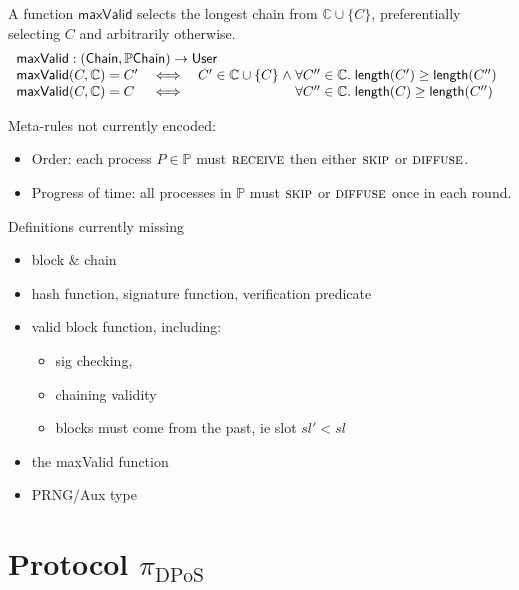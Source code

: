 \documentclass[12pt]{article}
\newcommand{\fun}[1]{\mathsf{#1}}
\begin{document}
A function $\fun{maxValid}$ selects the longest chain from
$\mathbb{C} \cup \{C\}$, preferentially selecting $C$ and arbitrarily otherwise.
\begin{equation*}
\begin{array}{l}
\fun{maxValid} : (\mathsf{Chain}, \mathbb{P}\mathsf{Chain}) \rightarrow \mathsf{User}
\\
\begin{array}{@{}l@{\quad \iff \quad}l@{}l}
\fun{maxValid} (C, \mathbb{C}) = C'
&
C' \in \mathbb{C} \cup \{C\}\; \land \; & \forall C'' \in \mathbb{C}.\; \mathsf{length}(C') \geq \mathsf{length}(C'')
\\
\fun{maxValid} (C, \mathbb{C}) = C 
&
& \forall C'' \in \mathbb{C}.\; \mathsf{length}(C) \geq \mathsf{length}(C'')
\end{array}
\end{array}
\end{equation*}


Meta-rules not currently encoded:
\begin{itemize}
\item Order: each process $P \in \mathbb{P}$ must $\textsc{receive}$ then
either $\textsc{skip}$ or $\textsc{diffuse}$.
\item Progress of time: all processes in $\mathbb{P}$ must $\textsc{skip}$ or $\textsc{diffuse}$
once in each round.
\end{itemize}

Definitions currently missing
\begin{itemize}
\item block \& chain
\item hash function, signature function, verification predicate
\item valid block function, including:
      \begin{itemize}
      \item sig checking,
      \item chaining validity
      \item blocks must come from the past, ie slot $sl' < sl$
      \end{itemize}
\item the maxValid function
\item PRNG/Aux type
\end{itemize}


\section{Protocol $\pi_{\text{DPoS}}$}
\end{document}
